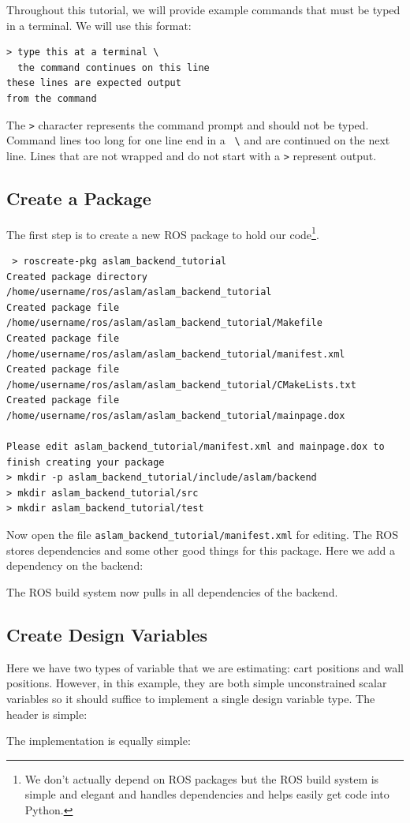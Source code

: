 \documentclass[11pt,a4,oneside]{article}
\newcommand{\txt}[1]{{\footnotesize\texttt{#1}}}
\newcommand{\rospack}[1]{\href{http://www.ros.org/wiki/#1}{{\rosfont{#1}}}}
\newcommand{\listcpp}[2]{}
\newcommand{\listxmlrange}[4]{}
\begin{document}
Throughout this tutorial, we will provide example commands that must be typed in a terminal. We will use this format:
\begin{lstlisting}
> type this at a terminal \
  the command continues on this line
these lines are expected output
from the command
\end{lstlisting}
The \txt{\textgreater} character represents the command prompt and should not be typed. Command lines too long for one line end in a \txt{ \textbackslash } and are continued on the next line. Lines that are not wrapped and do not start with a \txt{\textgreater} represent output.

\subsection{Create a Package}
The first step is to create a new ROS package to hold our code\footnote{We don't actually depend on ROS packages but the ROS build system is simple and elegant and handles dependencies and helps easily get code into Python.}. 
\begin{lstlisting}
 > roscreate-pkg aslam_backend_tutorial
Created package directory /home/username/ros/aslam/aslam_backend_tutorial
Created package file /home/username/ros/aslam/aslam_backend_tutorial/Makefile
Created package file /home/username/ros/aslam/aslam_backend_tutorial/manifest.xml
Created package file /home/username/ros/aslam/aslam_backend_tutorial/CMakeLists.txt
Created package file /home/username/ros/aslam/aslam_backend_tutorial/mainpage.dox

Please edit aslam_backend_tutorial/manifest.xml and mainpage.dox to finish creating your package
> mkdir -p aslam_backend_tutorial/include/aslam/backend
> mkdir aslam_backend_tutorial/src
> mkdir aslam_backend_tutorial/test
\end{lstlisting}
Now open the file \txt{aslam\_backend\_tutorial/manifest.xml} for editing. The ROS \rospack{Manifest} stores dependencies and some other good things for this package. Here we add a dependency on the backend:
\listxmlrange{manifest.xml}{../../aslam_backend_tutorial/manifest.xml}{12}{13}
The ROS build system now pulls in all dependencies of the backend.
\subsection{Create Design Variables}
Here we have two types of variable that we are estimating: cart positions and wall positions. However, in this example, they are both simple unconstrained scalar variables so it should suffice to implement a single design variable type. The header is simple:
\listcpp{include/aslam/backend/ScalarDesignVariable.hpp}{../../aslam_backend_tutorial/include/aslam/backend/ScalarDesignVariable.hpp}
The implementation is equally simple:
\listcpp{src/ScalarDesignVariable.cpp}{../../aslam_backend_tutorial/src/ScalarDesignVariable.cpp}
\end{document}
